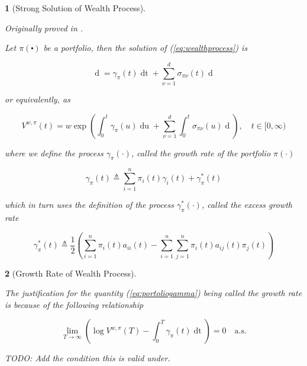 \documentclass[british]{amsart}
\numberwithin{equation}{section}
\numberwithin{figure}{section}
\theoremstyle{plain}
\newtheorem{thm}{\protect\theoremname}[section]
\theoremstyle{definition}
\theoremstyle{plain}
\theoremstyle{plain}
\theoremstyle{plain}
\newtheorem{prop}[thm]{\protect\propositionname}
\theoremstyle{remark}
\theoremstyle{plain}
\providecommand{\propositionname}{Proposition}
\providecommand{\theoremname}{Theorem}
\renewcommand{\d}[1]{\mathop{\mathrm{d}{#1}}}
\newcommand{\ranget}{t\in[0,\infty)}
\newcommand{\defeq}{\mathop{\triangleq}}
\newcommand{\almostsurely}{\text{a.s.}}
\begin{document}
\begin{prop} [Strong Solution of Wealth Process]
	\label{prop:solutionofwealthprocess}

	Originally proved in \cite{fernholz1999pgf}. 

	Let $\pi(\centerdot)$ be a portfolio, then the solution of (\ref{eq:wealthprocess}) is

	\begin{equation}
		\label{eq:wealthprocess}
		\d{V^{w,\pi}(t)} =  
				\gamma_{\pi}(t) \d{t} +
				\sum_{\nu=1}^{d} \sigma_{\pi\nu}(t) \d{W_{\nu}(t)}
	\end{equation}

	or equivalently, as

	\begin{equation}
		V^{w,\pi}(t) = w \exp{ 
			\left(
				\int_{0}^{t} \gamma_{\pi}(u) \d{u} +
				\sum_{\nu=1}^{d} \int_{0}^{t} \sigma_{\pi\nu}(u) \d{W_{\nu}(u)}
			\right)},
	\quad \ranget
	\end{equation}

	where we define the process $\gamma_{\pi}(\cdot)$, called the \textit{growth rate} of the 
	portfolio $\pi(\cdot)$

	\begin{equation}
		\label{eq:portfoliogamma}
		\gamma_{\pi}(t) \defeq \sum_{i=1}^{n} \pi_{i}(t)\gamma_{i}(t) + \gamma_{\pi}^{*}(t)
	\end{equation}

	which in turn uses the definition of the process $\gamma_{\pi}^{*}(\cdot)$, called the
	\textit{excess growth rate}

	\begin{equation}
		\gamma_{\pi}^{*}(t) \defeq \frac{1}{2} 
				\left(
					\sum_{i=1}^{n} \pi_{i}(t)a_{ii}(t) -
					\sum_{i=1}^{n} \sum_{j=1}^{n} \pi_{i}(t)a_{ij}(t)\pi_{j}(t)
				\right)
	\end{equation}

\end{prop}

\begin{thm} [Growth Rate of Wealth Process]
	\label{thm:wealthgrowthrate}

	The justification for the quantity (\ref{eq:portoliogamma}) being called the 
	\textit{growth rate} is	because of the following relationship

	\begin{equation}
		\lim_{T \to \infty} 
			\left( 
			\log{V^{w,\pi}(T)} - \int_{0}^{T} \gamma_{\pi}(t)\d{t} 
			\right) = 0
		\quad \almostsurely
	\end{equation}

	TODO: Add the condition this is valid under.

\end{thm}
\end{document}
